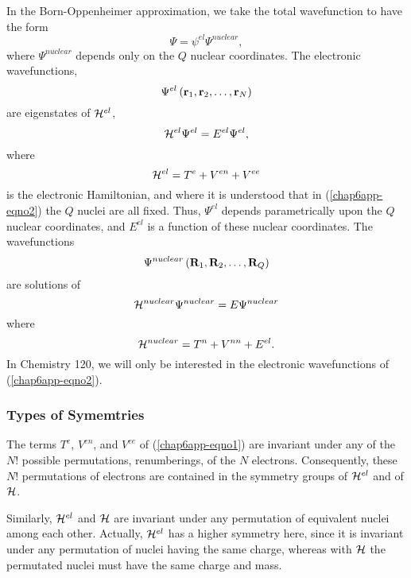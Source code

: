 In the Born-Oppenheimer approximation, we take the total wavefunction 
to have the form
\begin{equation}
\Psi = \psi^{el} \Psi^{nuclear},
\end{equation}
where $\Psi^{nuclear}$ depends only on the $Q$ nuclear coordinates.  
The electronic wavefunctions,
\begin{equation}
\Psi^{el} \left( {\bf r}_1 , {\bf r}_2 , \dots , {\bf r}_N \right)
\end{equation}
are eigenstates of ${\cal H}^{el}$,
\begin{equation}
{\cal H}^{el} \Psi^{el} = E^{el} \Psi^{el},
\label{chap6app-eqno2}
\end{equation}
where
\begin{equation}
{\cal H}^{el} = T^e + V^{en} + V^{ee}
\end{equation}
is the electronic Hamiltonian, and where it is understood that in
(\ref{chap6app-eqno2}) the $Q$ nuclei are all fixed.  Thus,
$\Psi^{el}$ depends parametrically upon the $Q$ nuclear coordinates,
and $E^{el}$ is a function of these nuclear coordinates.  The
wavefunctions
\begin{equation}
\Psi^{nuclear} \left( {\bf R}_1 , {\bf R}_2 , \dots , {\bf R}_Q 
\right)
\end{equation}
are solutions of
\begin{equation}
{\cal H}^{nuclear} \Psi^{nuclear} = E \Psi^{nuclear}
\end{equation}
where
\begin{equation}
{\cal H}^{nuclear} = T^n + V^{nn} + E^{el}.
\end{equation}
In Chemistry 120, we will only be interested in the electronic 
wavefunctions of (\ref{chap6app-eqno2}).

\subsubsection{Types of Symemtries}

The terms $T^e$, $V^{en}$, and $V^{ee}$ of (\ref{chap6app-eqno1}) are
invariant under any of the $N!$ possible permutations, renumberings,
of the $N$ electrons.  Consequently, these $N!$ permutations of
electrons are contained in the symmetry groups of ${\cal H}^{el}$ and
of ${\cal H}$.

Similarly, ${\cal H}^{el}$ and ${\cal H}$ are invariant under any 
permutation of equivalent nuclei among each other.  Actually, ${\cal 
H}^{el}$ has a higher symmetry here, since it is invariant under any 
permutation of nuclei having the same charge, whereas with ${\cal H}$ 
the permutated nuclei must have the same charge and mass.

